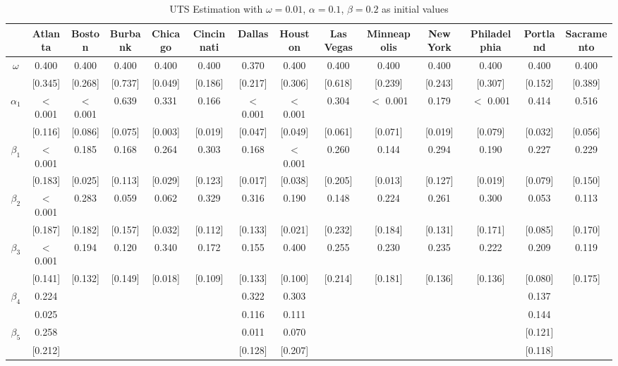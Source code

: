 \documentclass{article}
\begin{document}
	\begin{sidewaystable}[htbp]
		\centering
		\caption{UTS Estimation with $\omega = 0.01$, $\alpha = 0.1$, $\beta = 0.2$ as initial values}
		\begin{tabular}{cccccccccccccc}
			\toprule
			& Atlanta & Boston & Burbank & Chicago & Cincinnati & Dallas & Houston & Las Vegas & Minneapolis & New York & Philadelphia & Portland & Sacramento \\
			\midrule
			$\omega$ & 0.400 & 0.400 & 0.400 & 0.400 & 0.400 & 0.370 & 0.400 & 0.400 & 0.400 & 0.400 & 0.400 & 0.400 & 0.400 \\
			& [0.345] & [0.268] & [0.737] & [0.049] & [0.186] & [0.217] & [0.306] & [0.618] & [0.239] & [0.243] & [0.307] & [0.152] & [0.389] \\
			$\alpha_{1}$  & $<$0.001  & $<$0.001  & 0.639 & 0.331 & 0.166 & $<$ 0.001  & $<$ 0.001  & 0.304 & $<$ 0.001  & 0.179 & $<$ 0.001  & 0.414 & 0.516 \\
			& [0.116] & [0.086] & [0.075] & [0.003] & [0.019] & [0.047] & [0.049] & [0.061] & [0.071] & [0.019] & [0.079] & [0.032] & [0.056] \\
			$\beta_{1}$   & $<$ 0.001  & 0.185 & 0.168 & 0.264 & 0.303 & 0.168 & $<$ 0.001  & 0.260 & 0.144 & 0.294 & 0.190 & 0.227 & 0.229 \\
			& [0.183] & [0.025] & [0.113] & [0.029] & [0.123] & [0.017] & [0.038] & [0.205] & [0.013] & [0.127] & [0.019] & [0.079] & [0.150] \\
			$\beta_{2}$   & $<$0.001  & 0.283 & 0.059 & 0.062 & 0.329 & 0.316 & 0.190 & 0.148 & 0.224 & 0.261 & 0.300 & 0.053 & 0.113 \\
			& [0.187] & [0.182] & [0.157] & [0.032] & [0.112] & [0.133] & [0.021] & [0.232] & [0.184] & [0.131] & [0.171] & [0.085] & [0.170] \\
			$\beta_{3}$   & $<$ 0.001 & 0.194 & 0.120 & 0.340 & 0.172 & 0.155 & 0.400 & 0.255 & 0.230 & 0.235 & 0.222 & 0.209 & 0.119 \\
			& [0.141] & [0.132] & [0.149] & [0.018] & [0.109] & [0.133] & [0.100] & [0.214] & [0.181] & [0.136] & [0.136] & [0.080] & [0.175] \\
			$\beta_{4}$   & 0.224 & & & & & 0.322 & 0.303 & & & & & 0.137 & \\
			& 0.025 & & & & & 0.116 & 0.111 & & & & & 0.144 & \\
			$\beta_{5}$   & 0.258 & & & & & 0.011 & 0.070 & & & & & [0.121] & \\
			& [0.212] & & & & & [0.128] & [0.207] & & & & & [0.118] & \\
			\bottomrule
		\end{tabular}
	\end{sidewaystable}
	
\end{document}
